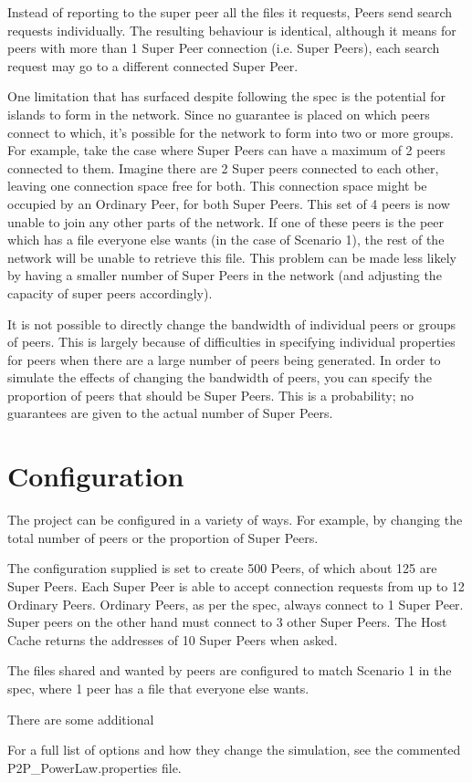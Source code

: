 \documentclass[a4paper,oneside]{article}
\begin{document}
\begin{appendices}
  Instead of reporting to the super peer all the files it requests, Peers send
  search requests individually. The resulting behaviour is identical, although
  it means for peers with more than 1 Super Peer connection (i.e. Super Peers),
  each search request may go to a different connected Super Peer.

  One limitation that has surfaced despite following the spec is the potential
  for islands to form in the network. Since no guarantee is placed on which
  peers connect to which, it's possible for the network to form into two or more
  groups.  For example, take the case where Super Peers can have a maximum of 2
  peers connected to them. Imagine there are 2 Super peers connected to each
  other, leaving one connection space free for both.  This connection space
  might be occupied by an Ordinary Peer, for both Super Peers.  This set of 4
  peers is now unable to join any other parts of the network.  If one of these
  peers is the peer which has a file everyone else wants (in the case of
  Scenario 1), the rest of the network will be unable to retrieve this file.
  This problem can be made less likely by having a smaller number of Super Peers
  in the network (and adjusting the capacity of super peers accordingly).

  It is not possible to directly change the bandwidth of individual peers or
  groups of peers. This is largely because of difficulties in specifying
  individual properties for peers when there are a large number of peers being
  generated.  In order to simulate the effects of changing the bandwidth of
  peers, you can specify the proportion of peers that should be Super Peers.
  This is a probability; no guarantees are given to the actual number of Super
  Peers.

  \section{Configuration}

  The project can be configured in a variety of ways. For example, by changing
  the total number of peers or the proportion of Super Peers.

  The configuration supplied is set to create 500 Peers, of which about 125 are
  Super Peers. Each Super Peer is able to accept connection requests from up to
  12 Ordinary Peers. Ordinary Peers, as per the spec, always connect to 1 Super
  Peer.  Super peers on the other hand must connect to 3 other Super Peers. The
  Host Cache returns the addresses of 10 Super Peers when asked.

  The files shared and wanted by peers are configured to match Scenario 1 in the
  spec, where 1 peer has a file that everyone else wants.

  There are some additional 



  For a full list of options and how they change the simulation, see the
  commented P2P_PowerLaw.properties file.

\end{appendices}
\end{document}
